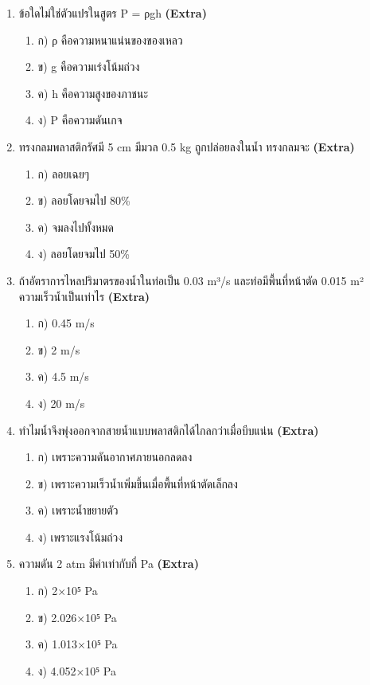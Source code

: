 \documentclass[12pt]{article}
\begin{document}
\begin{enumerate}[label=\arabic*.]
\begin{enumerate}[label=)]
\end{enumerate}
\item ข้อใดไม่ใช่ตัวแปรในสูตร P = ρgh \hfill \textbf{\small (Extra)}
\begin{enumerate}[label=)]
\item ก) ρ คือความหนาแน่นของของเหลว
\item ข) g คือความเร่งโน้มถ่วง
\item ค) h คือความสูงของภาชนะ
\item ง) P คือความดันเกจ
\end{enumerate}
\item ทรงกลมพลาสติกรัศมี 5 cm มีมวล 0.5 kg ถูกปล่อยลงในน้ำ ทรงกลมจะ \hfill \textbf{\small (Extra)}
\begin{enumerate}[label=)]
\item ก) ลอยเฉยๆ
\item ข) ลอยโดยจมไป 80\%
\item ค) จมลงไปทั้งหมด
\item ง) ลอยโดยจมไป 50\%
\end{enumerate}
\item ถ้าอัตราการไหลปริมาตรของน้ำในท่อเป็น 0.03 m³/s และท่อมีพื้นที่หน้าตัด 0.015 m² ความเร็วน้ำเป็นเท่าไร \hfill \textbf{\small (Extra)}
\begin{enumerate}[label=)]
\item ก) 0.45 m/s
\item ข) 2 m/s
\item ค) 4.5 m/s
\item ง) 20 m/s
\end{enumerate}
\item ทำไมน้ำจึงพุ่งออกจากสายน้ำแบบพลาสติกได้ไกลกว่าเมื่อบีบแน่น \hfill \textbf{\small (Extra)}
\begin{enumerate}[label=)]
\item ก) เพราะความดันอากาศภายนอกลดลง
\item ข) เพราะความเร็วน้ำเพิ่มขึ้นเมื่อพื้นที่หน้าตัดเล็กลง
\item ค) เพราะน้ำขยายตัว
\item ง) เพราะแรงโน้มถ่วง
\end{enumerate}
\item ความดัน 2 atm มีค่าเท่ากับกี่ Pa \hfill \textbf{\small (Extra)}
\begin{enumerate}[label=)]
\item ก) 2×10⁵ Pa
\item ข) 2.026×10⁵ Pa
\item ค) 1.013×10⁵ Pa
\item ง) 4.052×10⁵ Pa
\end{enumerate}

\end{enumerate}
\end{document}
